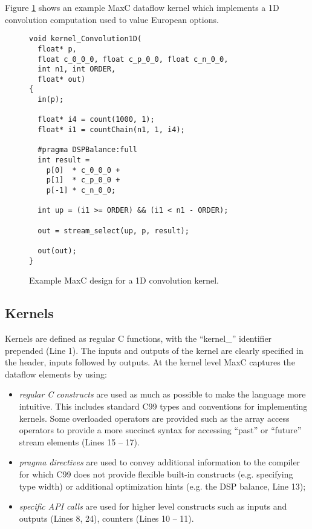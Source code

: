 Figure \ref{fig:maxc-1dconv} shows an example MaxC dataflow kernel
which implements a 1D convolution computation used to value European
options.


\lstset{style=MaxC}

\begin{figure}
\begin{lstlisting}
void kernel_Convolution1D(
  float* p,
  float c_0_0_0, float c_p_0_0, float c_n_0_0,
  int n1, int ORDER,
  float* out)
{
  in(p);

  float* i4 = count(1000, 1);
  float* i1 = countChain(n1, 1, i4);

  #pragma DSPBalance:full
  int result =
    p[0]  * c_0_0_0 +
    p[1]  * c_p_0_0 +
    p[-1] * c_n_0_0;

  int up = (i1 >= ORDER) && (i1 < n1 - ORDER);

  out = stream_select(up, p, result);

  out(out);
}
\end{lstlisting}
\caption{Example MaxC design for a 1D convolution kernel.}
\label{fig:maxc-1dconv}
\end{figure}

\subsection{Kernels}

Kernels are defined as regular C functions, with the ``kernel\_''
identifier prepended (Line 1). The inputs and outputs of the kernel
are clearly specified in the header, inputs followed by outputs. At
the kernel level MaxC captures the dataflow elements by using:

\begin{itemize}
\item \emph{regular C constructs} are used as much as possible to make
  the language more intuitive. This includes standard C99 types and
  conventions for implementing kernels. Some overloaded operators are
  provided such as the array access operators to provide a more
  succinct syntax for accessing ``past'' or ``future'' stream elements
  (Lines 15 -- 17).

\item \emph{pragma directives} are used to convey additional
  information to the compiler for which C99 does not provide flexible
  built-in constructs (e.g. specifying type width) or additional
  optimization hints (e.g. the DSP balance, Line 13);

\item \emph{specific API calls} are used for higher level constructs
  such as inputs and outputs (Lines 8, 24), counters (Lines 10 -- 11).

\end{itemize}


